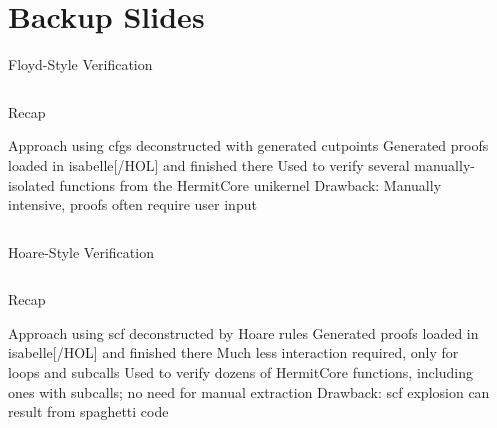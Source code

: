 \section{Backup Slides}
\begin{frame}[label=floyd]{Floyd-Style Verification}
  \begin{columns}
    \begin{block}{Recap}
      \begin{outline}
        \1 Approach using \glspl{cfg} deconstructed with generated \alert{cutpoints}
        \1 Generated proofs loaded in \gls{isabelle}[/HOL] and finished there
        \1 Used to verify several manually-isolated functions from \alert{the HermitCore unikernel}
        \1 Drawback: Manually intensive, proofs often require user input
      \end{outline}
    \end{block}

    \begin{example}
    \end{example}
  \end{columns}
\end{frame}

\begin{frame}[label=hoare]{Hoare-Style Verification}
  \begin{columns}
    \begin{block}{Recap}
      \begin{outline}
        \1 Approach using \gls{scf} deconstructed by \alert{Hoare rules}
        \1 Generated proofs loaded in \gls{isabelle}[/HOL] and finished there
        \2 Much less interaction required, only for loops and subcalls
        \1 Used to verify dozens of HermitCore functions, including ones with subcalls; no need for manual extraction
        \1 Drawback: \gls{scf} explosion can result from spaghetti code
      \end{outline}
    \end{block}

    \begin{example}
    \end{example}
  \end{columns}
\end{frame}
